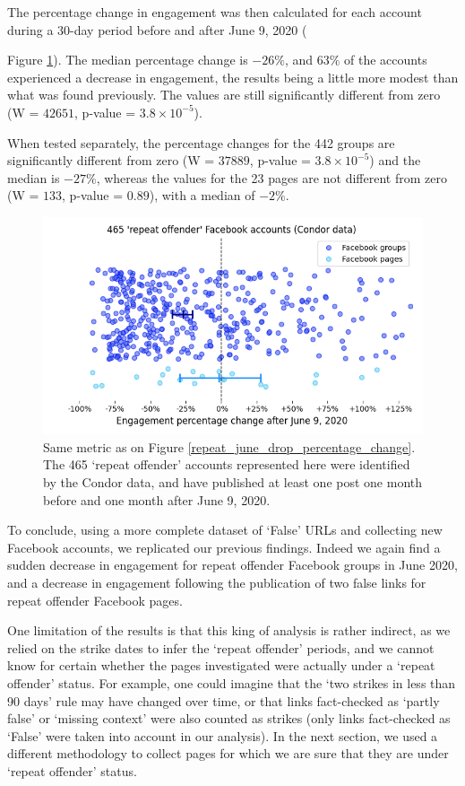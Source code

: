 \documentclass[review]{elsarticle}
\begin{document}
The percentage change in engagement was then calculated for each account during a 30-day period before and after June 9, 2020 ({Figure \ref{condor_june_drop_percentage_change}).
The median percentage change is $-26\%$, and $63\%$ of the accounts experienced a decrease in engagement, the results being a little more modest than what was found previously.
The values are still significantly different from zero (W = $42651$, p-value = $3.8 \times 10^{-5}$).

When tested separately, the percentage changes for the 442 groups are significantly different from zero (W = $37889$, p-value = $3.8 \times 10^{-5}$) and the median is $-27\%$, whereas the values for the 23 pages are not different from zero (W = $133$, p-value = $0.89$), with a median of $-2\%$.

\begin{figure}[!h]
\centering
\includegraphics[scale=0.5]{./../figure/condor_june_drop_percentage_change.png}
\caption{
Same metric as on Figure \ref{repeat_june_drop_percentage_change}.
The 465 `repeat offender' accounts represented here were identified by the Condor data, and have published at least one post one month before and one month after June 9, 2020.
}
\label{condor_june_drop_percentage_change}
\end{figure}

To conclude, using a more complete dataset of `False' URLs and collecting new Facebook accounts, we replicated our previous findings. 
Indeed we again find a sudden decrease in engagement for repeat offender Facebook groups in June 2020, and a decrease in engagement following the publication of two false links for repeat offender Facebook pages.

One limitation of the results is that this king of analysis is rather indirect, as we relied on the strike dates to infer the `repeat offender' periods, and we cannot know for certain whether the pages investigated were actually under a `repeat offender' status. 
For example, one could imagine that the `two strikes in less than 90 days' rule may have changed over time, or that links fact-checked as `partly false' or `missing context' were also counted as strikes (only links fact-checked as `False' were taken into account in our analysis).
In the next section, we used a different methodology to collect pages for which we are sure that they are under `repeat offender' status.

}
\end{document}
